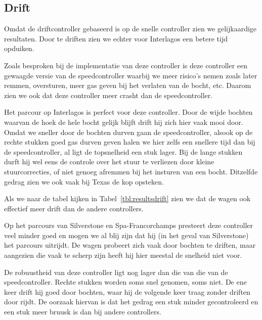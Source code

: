 \subsection{Drift}
Omdat de driftcontroller gebaseerd is op de snelle controller zien we 
gelijkaardige resultaten. Door te driften zien we echter voor Interlagos een 
betere tijd opduiken.

Zoals besproken bij de implementatie van deze controller is deze controller een 
gewaagde versie van de speedcontroller waarbij we meer risico's nemen zoals 
later remmen, oversturen, meer gas geven bij het verlaten van de bocht, etc. 
Daarom zien we ook dat deze controller meer crasht dan de speedcontroller. 

Het parcour op Interlagos is perfect voor deze controller. Door de wijde 
bochten waarvan de hoek de hele bocht gelijk blijft drift hij zich hier vaak 
mooi door. Omdat we sneller door de bochten durven gaan de speedcontroller, 
alsook op de rechte stukken goed gas durven geven halen we hier zelfs een 
snellere tijd dan bij de speedcontroller, al ligt de topsnelheid een stuk 
lager. Bij de lange stukken durft hij wel eens de controle over het stuur 
te verliezen door kleine stuurcorrecties, of niet genoeg afremmen bij het 
insturen van een bocht. Ditzelfde gedrag zien we ook vaak bij Texas de kop 
opsteken.

Als we naar de tabel kijken in Tabel~\ref{tbl:resultsdrift} zien we dat de 
wagen ook effectief meer drift dan de andere controllers.

Op het parcours van Silverstone en Spa-Francorchamps presteert deze controller 
veel minder goed en mogen we al blij zijn dat hij (in het geval van 
Silverstone) het parcours uitrijdt. De wagen probeert zich vaak door bochten te 
driften, maar aangezien die vaak te scherp zijn heeft hij hier meestal de 
snelheid niet voor.

De robuustheid van deze controller ligt nog lager dan die van die van de 
speedcontroller. Rechte stukken worden soms snel genomen, soms niet. De ene 
keer drift hij goed door bochten, waar hij de volgende keer traag zonder 
driften door rijdt. De oorzaak hiervan is dat het gedrag een stuk minder 
gecontroleerd en een stuk meer bruusk is dan bij andere controllers.